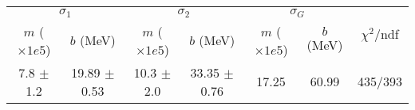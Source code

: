 \begin{tabular}{cc|cc|cc||c}
\multicolumn{2}{c|}{$\sigma_1$} & \multicolumn{2}{|c}{$\sigma_2$} & \multicolumn{2}{|c}{$\sigma_G$}  & \multirow{2}{*}{$\chi^2/$ndf}\\
$m$ ($\times1e5$) & $b$ (MeV) & $m$ ($\times1e5$) & $b$ (MeV) & $m$ ($\times1e5$) & $b$ (MeV) & \\
\hline
7.8 $\pm$ 1.2 & 19.89 $\pm$ 0.53 & 10.3 $\pm$ 2.0 & 33.35 $\pm$ 0.76 & 17.25 & 60.99 & 435/393\\
\end{tabular}
